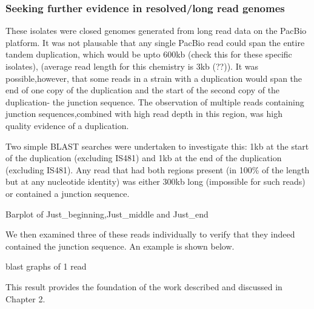 
\subsubsection{Seeking further evidence in resolved/long read genomes}

These isolates were closed genomes generated from long read data on the PacBio platform. It was not plausable that any single PacBio read could span the entire tandem duplication, which would be upto 600kb (check this for these specific isolates), (average read length for this chemistry is 3kb (??)). It was possible,however, that some reads  in a strain with a duplication would span the end of one copy of the duplication and the start of the second copy of the duplication- the junction sequence. The observation of multiple reads containing junction sequences,combined with high read depth in this region, was high quality evidence of a duplication. 

Two simple BLAST searches were undertaken to investigate this: 1kb at the start of the duplication (excluding IS481) and 1kb at the end of the duplication (excluding IS481). Any read that had both regions present (in 100\% of the length but at any nucleotide identity) was either 300kb long (impossible for such reads) or contained a junction sequence.

{Barplot of Just_beginning,Just_middle and Just_end}

We then examined three of these reads individually to verify that they indeed contained the junction sequence. An example is shown below.


{blast graphs of 1 read}

This result provides the foundation of the work described and discussed in Chapter 2.